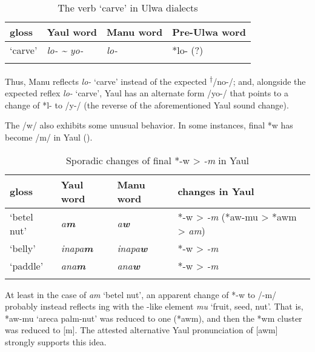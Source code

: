 \begin{table}


\caption{\label{tab:18.11} The verb ‘carve’ in Ulwa dialects}

\begin{tabular}{llll}

\lsptoprule

gloss & Yaul word & Manu word & Pre-Ulwa word\\
\midrule
‘carve’ & {\itshape lo- \textup{{\textasciitilde}} yo-} & {\itshape lo-} & *lo- (?)\\
\lspbottomrule
\end{tabular}
\end{table}
Thus, Manu reflects \textit{lo-} ‘carve’ instead of the expected \textsuperscript{†}/no-/; and, alongside the expected reflex \textit{lo-} ‘carve’, Yaul has an alternate form /yo-/ that points to a change of *l- to /y-/ (the reverse of the aforementioned Yaul sound change).

  The  /w/ also exhibits some unusual behavior. In some instances, final *w has become /m/ in Yaul ().

\begin{table}
\caption{\label{tab:18.12} Sporadic changes of final *-w > \textit{{}-m} in Yaul}


\begin{tabularx}{\textwidth}{lllQ}

\lsptoprule

gloss & Yaul word & Manu word & changes in Yaul\\
\midrule
‘betel nut’ & {\itshape a\textbf{m}} & {\itshape a\textbf{w}} & *-w > \textit{{}-m} (*aw-mu > *awm > \textit{am})\\
‘belly’ & {\itshape inapa\textbf{m}} & {\itshape inapa\textbf{w}} & *-w > \textit{{}-m}\\
‘paddle’ & {\itshape ana\textbf{m}} & {\itshape ana\textbf{w}} & *-w > \textit{{}-m}\\
\lspbottomrule
\end{tabularx}
\end{table}
At least in the case of \textit{am} ‘betel nut’, an apparent change of *-w to /-m/ probably instead reflects ing with the -like element \textit{mu} ‘fruit, seed, nut’. That is, *aw-mu ‘areca palm-nut’ was reduced to one  (*awm), and then the  *wm cluster was reduced to [m]. The attested alternative Yaul pronunciation of [awm] strongly supports this idea.

